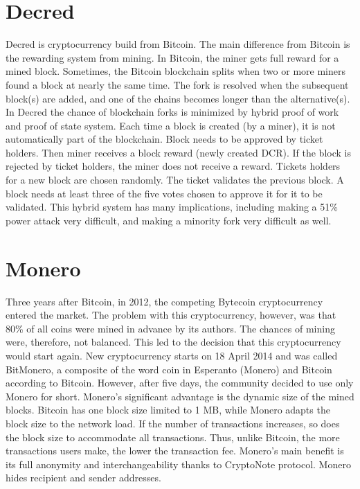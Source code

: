 \section{Decred}
Decred is cryptocurrency build from Bitcoin. The main difference from Bitcoin is the rewarding system from mining. In Bitcoin, the miner gets full reward for a mined block. Sometimes, the Bitcoin blockchain splits when two or more miners found a block at nearly the same time. The fork is resolved when the subsequent block(s) are added, and one of the chains becomes longer than the alternative(s). In Decred the chance of blockchain forks is minimized by hybrid proof of work and proof of state system. Each time a block is created (by a miner), it is not automatically part of the blockchain. Block needs to be approved by ticket holders. Then miner receives a block reward (newly created DCR). If the block is rejected by ticket holders, the miner does not receive a reward. Tickets holders for a new block are chosen randomly. The ticket validates the previous block. A block needs at least three of the five votes chosen to approve it for it to be validated.  This hybrid system has many implications, including making a 51\% power attack very difficult, and making a minority fork very difficult as well.\cite{decredWhitePaper}

\section{Monero}
Three years after Bitcoin, in 2012, the competing Bytecoin cryptocurrency entered the market. The problem with this cryptocurrency, however, was that 80\% of all coins were mined in advance by its authors. The chances of mining were, therefore, not balanced. This led to the decision that this cryptocurrency would start again. New cryptocurrency starts on 18 April 2014 and was called BitMonero, a composite of the word coin in Esperanto (Monero) and Bitcoin according to Bitcoin. However, after five days, the community decided to use only Monero for short. Monero's significant advantage is the dynamic size of the mined blocks. Bitcoin has one block size limited to 1 MB, while Monero adapts the block size to the network load. If the number of transactions increases, so does the block size to accommodate all transactions. Thus, unlike Bitcoin, the more transactions users make, the lower the transaction fee. Monero's main benefit is its full anonymity and interchangeability thanks to CryptoNote protocol\cite{van2013cryptonote}. Monero hides recipient and sender addresses.\cite{moneroTracebility}

